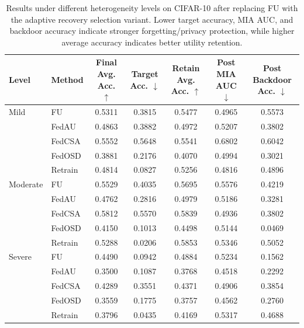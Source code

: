 \begin{table}[t]
\centering
\caption{Results under different heterogeneity levels on CIFAR-10 after replacing FU with the adaptive recovery selection variant. Lower target accuracy, MIA AUC, and backdoor accuracy indicate stronger forgetting/privacy protection, while higher average accuracy indicates better utility retention.}
\label{tab:heterogeneity_results}
\begin{tabular}{llccccc}
\toprule
Level & Method & Final Avg. Acc. $\uparrow$ & Target Acc. $\downarrow$ & Retain Avg. Acc. $\uparrow$ & Post MIA AUC $\downarrow$ & Post Backdoor Acc. $\downarrow$ \\
\midrule
Mild & FU & 0.5311 & 0.3815 & 0.5477 & 0.4965 & 0.5573 \\
 & FedAU & 0.4863 & 0.3882 & 0.4972 & 0.5207 & 0.3802 \\
 & FedCSA & 0.5552 & 0.5648 & 0.5541 & 0.6802 & 0.6042 \\
 & FedOSD & 0.3881 & 0.2176 & 0.4070 & 0.4994 & 0.3021 \\
 & Retrain & 0.4814 & 0.0827 & 0.5256 & 0.4816 & 0.4896 \\
\midrule
Moderate & FU & 0.5529 & 0.4035 & 0.5695 & 0.5576 & 0.4219 \\
 & FedAU & 0.4762 & 0.2816 & 0.4979 & 0.5186 & 0.3281 \\
 & FedCSA & 0.5812 & 0.5570 & 0.5839 & 0.4936 & 0.3802 \\
 & FedOSD & 0.4150 & 0.1013 & 0.4498 & 0.5144 & 0.0469 \\
 & Retrain & 0.5288 & 0.0206 & 0.5853 & 0.5346 & 0.5052 \\
\midrule
Severe & FU & 0.4490 & 0.0942 & 0.4884 & 0.5234 & 0.1562 \\
 & FedAU & 0.3500 & 0.1087 & 0.3768 & 0.4518 & 0.2292 \\
 & FedCSA & 0.4289 & 0.3551 & 0.4371 & 0.4906 & 0.3854 \\
 & FedOSD & 0.3559 & 0.1775 & 0.3757 & 0.4562 & 0.2760 \\
 & Retrain & 0.3796 & 0.0435 & 0.4169 & 0.5317 & 0.4688 \\
\bottomrule
\end{tabular}
\end{table}